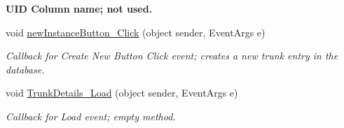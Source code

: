 \begin{Indent}{\bf UID Column name; not used.}
\begin{DoxyCompactItemize}
void \hyperlink{class_ias_pbx_config_1_1_trunk_details_a63675d1136bcddb728c7907a1a065ead}{newInstanceButton\_\-Click} (object sender, EventArgs e)
\begin{DoxyCompactList}\small\item\em Callback for Create New Button Click event; creates a new trunk entry in the database. \item\end{DoxyCompactList}\item 
void \hyperlink{class_ias_pbx_config_1_1_trunk_details_ab9b3bd0939b49cb616b15a7de3cb1d77}{TrunkDetails\_\-Load} (object sender, EventArgs e)
\begin{DoxyCompactList}\small\item\em Callback for Load event; empty method. \item\end{DoxyCompactList}\end{DoxyCompactItemize}
\end{Indent}
